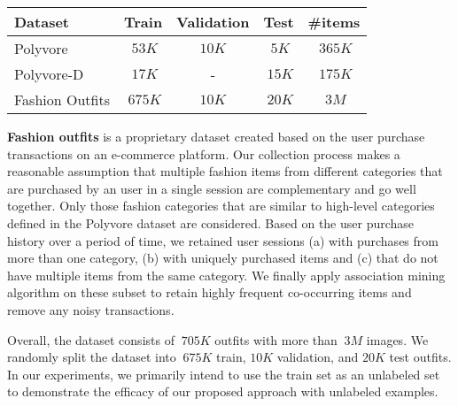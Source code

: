 \documentclass[sigconf]{acmart}
\begin{document}
\begin{table}

\vspace{1.5mm}
\begin{tabular}{l|cccc}
    \hline
        Dataset & Train & Validation & Test & \#items \\
        \hline
        Polyvore & $~53K$ & $10K$ & $~5K$ & $~365K$ \\
        Polyvore-D & $~17K$ & - & $~15K$ & $~175K$ \\
        Fashion Outfits & $~675K$ & $10K$ & $~20K$ & $~3M$ \\
        \hline
    \end{tabular}
    
    \label{table:datasets}
\end{table}

\vspace{2mm}
\noindent \textbf{Fashion outfits} is a proprietary dataset created based on the user purchase transactions on an e-commerce platform. Our collection process makes a reasonable assumption that multiple fashion items from different categories that are purchased by an user in a single session are complementary and go well together. Only those fashion categories that are similar to high-level categories defined in the Polyvore dataset are considered. Based on the user purchase history over a period of time, we retained user sessions (a) with purchases from more than one category, (b) with uniquely purchased items and (c) that do not have multiple items from the same category. We finally apply association mining algorithm \cite{apriori} on these subset to retain highly frequent co-occurring items and remove any noisy transactions.

Overall, the dataset consists of $~705K$ outfits with more than $~3M$ images. We randomly split the dataset into $~675K$ train, $10K$ validation, and $20K$ test outfits. In our experiments, we primarily intend to use the train set as an unlabeled set to demonstrate the efficacy of our proposed approach with unlabeled examples.
\end{document}
